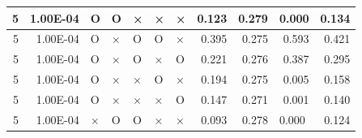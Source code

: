 \documentclass[11pt]{article}
\begin{document}
\begin{longtable}[h]{|r|r|l|l|l|l|l|r|r|l|r|}
5                                 & 1.00E-04                         & O                                & O                                & ×                                & ×                                & ×                                 & 0.123                             & 0.279                             & 0.000                              & 0.134                               \\ \hline
5                                 & 1.00E-04                         & O                                & ×                                & O                                & O                                & ×                                 & 0.395                             & 0.275                             & \multicolumn{1}{r|}{0.593}         & 0.421                               \\ \hline
5                                 & 1.00E-04                         & O                                & ×                                & O                                & ×                                & O                                 & 0.221                             & 0.276                             & \multicolumn{1}{r|}{0.387}         & 0.295                               \\ \hline
5                                 & 1.00E-04                         & O                                & ×                                & ×                                & O                                & ×                                 & 0.194                             & 0.275                             & \multicolumn{1}{r|}{0.005}         & 0.158                               \\ \hline
5                                 & 1.00E-04                         & O                                & ×                                & ×                                & ×                                & O                                 & 0.147                             & 0.271                             & \multicolumn{1}{r|}{0.001}         & 0.140                               \\ \hline
5                                 & 1.00E-04                         & ×                                & O                                & O                                & ×                                & ×                                 & 0.093                             & 0.278                             & 0.000                              & 0.124                               \\ \hline

\end{longtable}
\end{document}
